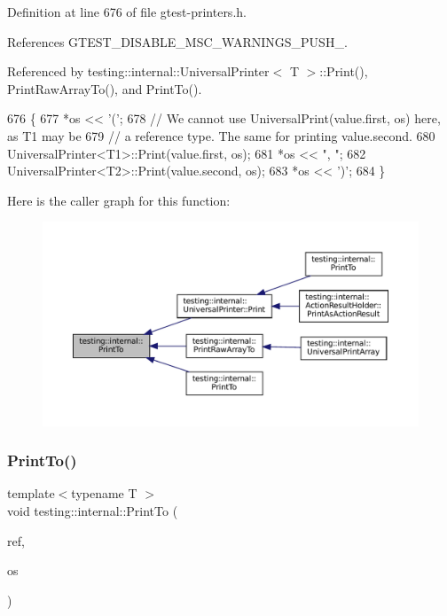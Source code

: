 Definition at line 676 of file gtest-\/printers.\+h.



References G\+T\+E\+S\+T\+\_\+\+D\+I\+S\+A\+B\+L\+E\+\_\+\+M\+S\+C\+\_\+\+W\+A\+R\+N\+I\+N\+G\+S\+\_\+\+P\+U\+S\+H\+\_\+.



Referenced by testing\+::internal\+::\+Universal\+Printer$<$ T $>$\+::\+Print(), Print\+Raw\+Array\+To(), and Print\+To().


\begin{DoxyCode}
676                                                            \{
677   *os << \textcolor{charliteral}{'('};
678   \textcolor{comment}{// We cannot use UniversalPrint(value.first, os) here, as T1 may be}
679   \textcolor{comment}{// a reference type.  The same for printing value.second.}
680   UniversalPrinter<T1>::Print(value.first, os);
681   *os << \textcolor{stringliteral}{", "};
682   UniversalPrinter<T2>::Print(value.second, os);
683   *os << \textcolor{charliteral}{')'};
684 \}
\end{DoxyCode}
Here is the caller graph for this function\+:
\nopagebreak
\begin{figure}[H]
\begin{center}
\leavevmode
\includegraphics[width=350pt]{namespacetesting_1_1internal_af2c33928facbf2edf7af564278724d98_icgraph}
\end{center}
\end{figure}
\mbox{\label{namespacetesting_1_1internal_a8fd10cc30084c36a89c74868c8bd53f8}} 
\subsubsection{\texorpdfstring{Print\+To()}{PrintTo()}\hspace{0.1cm}{\footnotesize\ttfamily [20/20]}}
{\footnotesize\ttfamily template$<$typename T $>$ \\
void testing\+::internal\+::\+Print\+To (\begin{DoxyParamCaption}\item[{const \hyperlink{classtesting_1_1internal_1_1ReferenceWrapper}{Reference\+Wrapper}$<$ T $>$ \&}]{ref,  }\item[{\+::std\+::ostream $\ast$}]{os }\end{DoxyParamCaption})}




